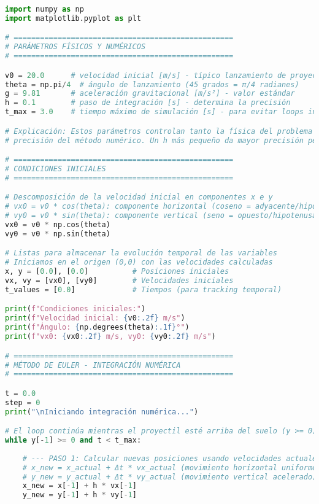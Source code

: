 \documentclass[12pt,a4paper]{article}
\begin{document}
\begin{lstlisting}[language=Python, basicstyle=\small\ttfamily]
import numpy as np
import matplotlib.pyplot as plt

# ==================================================
# PARÁMETROS FÍSICOS Y NUMÉRICOS
# ==================================================

v0 = 20.0      # velocidad inicial [m/s] - típico lanzamiento de proyectil
theta = np.pi/4  # ángulo de lanzamiento (45 grados = π/4 radianes)
g = 9.81       # aceleración gravitacional [m/s²] - valor estándar
h = 0.1        # paso de integración [s] - determina la precisión
t_max = 3.0    # tiempo máximo de simulación [s] - para evitar loops infinitos

# Explicación: Estos parámetros controlan tanto la física del problema como la
# precisión del método numérico. Un h más pequeño da mayor precisión pero mayor costo computacional.

# ==================================================
# CONDICIONES INICIALES
# ==================================================

# Descomposición de la velocidad inicial en componentes x e y
# vx0 = v0 * cos(theta): componente horizontal (coseno = adyacente/hipotenusa)
# vy0 = v0 * sin(theta): componente vertical (seno = opuesto/hipotenusa)
vx0 = v0 * np.cos(theta)
vy0 = v0 * np.sin(theta)

# Listas para almacenar la evolución temporal de las variables
# Iniciamos en el origen (0,0) con las velocidades calculadas
x, y = [0.0], [0.0]          # Posiciones iniciales
vx, vy = [vx0], [vy0]        # Velocidades iniciales
t_values = [0.0]             # Tiempos (para tracking temporal)

print(f"Condiciones iniciales:")
print(f"Velocidad inicial: {v0:.2f} m/s")
print(f"Ángulo: {np.degrees(theta):.1f}°")
print(f"vx0: {vx0:.2f} m/s, vy0: {vy0:.2f} m/s")

# ==================================================
# MÉTODO DE EULER - INTEGRACIÓN NUMÉRICA
# ==================================================

t = 0.0
step = 0
print("\nIniciando integración numérica...")

# El loop continúa mientras el proyectil esté arriba del suelo (y >= 0)
while y[-1] >= 0 and t < t_max:
    
    # --- PASO 1: Calcular nuevas posiciones usando velocidades actuales ---
    # x_new = x_actual + Δt * vx_actual (movimiento horizontal uniforme)
    # y_new = y_actual + Δt * vy_actual (movimiento vertical acelerado)
    x_new = x[-1] + h * vx[-1]
    y_new = y[-1] + h * vy[-1]
    

\end{lstlisting}
\end{document}
